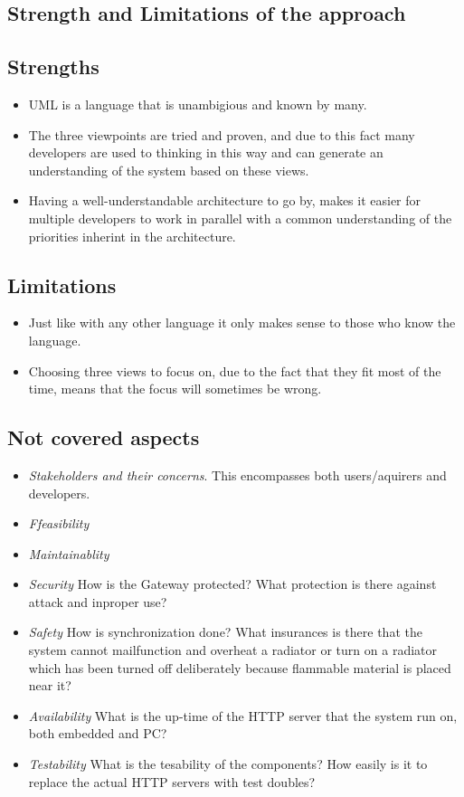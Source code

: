 \documentclass[a4paper,10pt]{article}
\begin{document}
\subsection{Strength and Limitations of the approach}
\subsection{Strengths}
\begin{itemize}
\item UML is a language that is unambigious and known by many.
\item The three viewpoints are tried and proven, and due to this fact many developers are used to thinking in this way and can generate an understanding of the system based on these views.
 \item Having a well-understandable architecture to go by, makes it easier for multiple developers to work in parallel with a common understanding of the priorities inherint in the architecture.
\end{itemize}

\subsection{Limitations}
\begin{itemize}
\item Just like with any other language it only makes sense to those who know the language. 
\item Choosing three views to focus on, due to the fact that they fit most of the time, means that the focus will sometimes be wrong.
\end{itemize}

\subsection{Not covered aspects}
\begin{itemize}
\item \emph{Stakeholders and their concerns}. This encompasses both users/aquirers and developers. \item \emph{Ffeasibility}
\item \emph{Maintainablity}
\item \emph{Security} How is the Gateway protected? What protection is there against attack and inproper use? 
\item \emph {Safety} How is synchronization done? What insurances is there that the system cannot mailfunction and overheat a radiator or turn on a radiator which has been turned off deliberately because flammable material is placed near it?
\item \emph{Availability} What is the up-time of the HTTP server that the system run on, both embedded and PC?
\item \emph{Testability} What is the tesability of the components? How easily is it to replace the actual HTTP servers with test doubles?
\end{itemize}
\end{document}
